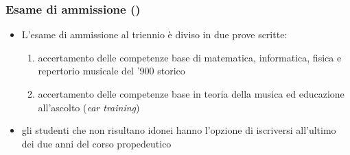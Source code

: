 %
%
%

\setcounter{ms}{0}
\begin{frame}
    \frametitle<+->{Esame di ammissione ()}

	\begin{itemize}[<+- | alert@+->]

		\item L'esame di ammissione al triennio è diviso in due prove scritte:

      \begin{enumerate}[<+- | alert@+->]

        \item accertamento delle competenze base di matematica,
        informatica, fisica e repertorio musicale del '900 storico


        \item accertamento delle competenze base in teoria della musica ed
        educazione all'ascolto (\emph{ear training})

     \end{enumerate}

    \item gli studenti che non risultano idonei hanno l'opzione di iscriversi 
    all'ultimo dei due anni del corso propedeutico

	\end{itemize}

\end{frame}
